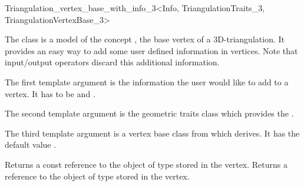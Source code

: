 

\begin{ccRefClass}{Triangulation_vertex_base_with_info_3<Info, TriangulationTraits_3, TriangulationVertexBase_3>}

\ccDefinition

The class  is a model of the concept
, the base vertex of a 3D-triangulation.
It provides an easy way to add some user defined information in vertices.
Note that input/output operators discard this additional information.


\ccParameters

The first template argument is the information the user would like to add
to a vertex.  It has to be  and .

The second template argument is the geometric traits class
 which provides the .

The third template argument is a vertex base class from which
 derives.  It has the default
value .

\ccIsModel {}

\ccInheritsFrom {}

\ccTypes
{}


\ccAccessFunctions
{}
\ccTagFullDeclarations

{Returns a const reference to the object of type  stored in the
vertex.}
\ccGlue
{}
{Returns a reference to the object of type  stored in the vertex.}
\ccSeeAlso

\\

\end{ccRefClass}
